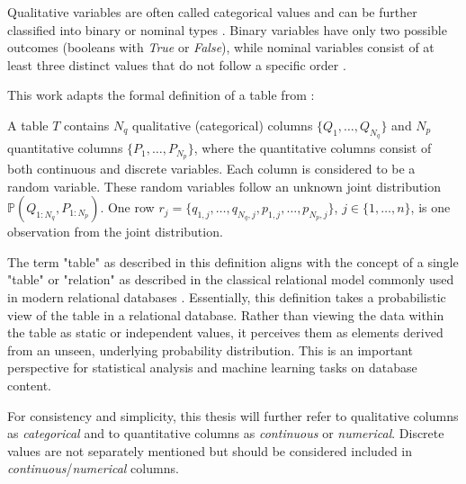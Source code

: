 Qualitative variables are often called categorical values and can be further classified into binary or nominal types \cite{lane2003IntroductionStatistics}.
Binary variables have only two possible outcomes (\eg booleans with \textit{True} or \textit{False}), while nominal variables consist of at least three distinct values that do not follow a specific order \cite{lederrey2022DATGANIntegratingExperta, lane2003IntroductionStatistics}.

\newpage
This work adapts the formal definition of a table from \cite{xu2019ModelingTabularData}:

\begin{displayquote}
A table \textbf{$T$} contains $N_q$ qualitative (categorical) columns $\{Q_1, \dots, Q_{N_q}\}$ and $N_p$ quantitative columns $\{P_1, \dots, P_{N_p}\}$, 
where the quantitative columns consist of both continuous and discrete variables. 
Each column is considered to be a random variable. 
These random variables follow an unknown joint distribution $\mathbb{P}(Q_{1:N_q}, P_{1:N_p})$. 
One row $r_j = \{q_{1,j}, \dots, q_{N_q,j}, p_{1,j}, \dots, p_{N_p,j}\}$, $j \in \{1, \dots, n\}$, is one observation from the joint distribution.
\end{displayquote}

The term "table" as described in this definition aligns with the concept of a single "table" or "relation" as described in the classical relational model \cite{codd1970RelationalModelData} commonly used in modern relational databases \cite{w.eembley2009RelationalModel}.
Essentially, this definition takes a probabilistic view of the table in a relational database.
Rather than viewing the data within the table as static or independent values, it perceives them as elements derived from an unseen, underlying probability distribution.
This is an important perspective for statistical analysis and machine learning tasks on database content.

\cite{codd1970RelationalModelData}

For consistency and simplicity, this thesis will further refer to qualitative columns as \textit{categorical} and to quantitative columns as \textit{continuous} or \textit{numerical}. 
Discrete values are not separately mentioned but should be considered included in \textit{continuous}/\textit{numerical} columns.

